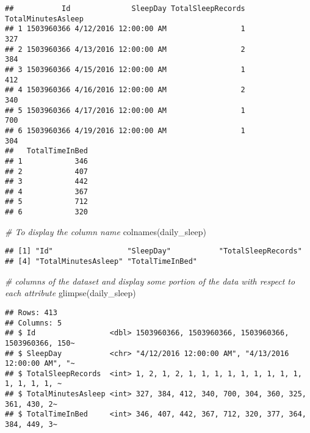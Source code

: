 \documentclass[
]{article}
\newenvironment{Shaded}{\begin{snugshade}}{\end{snugshade}}
\newcommand{\CommentTok}[1]{\textcolor[rgb]{0.56,0.35,0.01}{\textit{#1}}}
\newcommand{\FunctionTok}[1]{\textcolor[rgb]{0.00,0.00,0.00}{#1}}
\newcommand{\NormalTok}[1]{#1}
\newcommand{\SpecialCharTok}[1]{\textcolor[rgb]{0.00,0.00,0.00}{#1}}
\begin{document}
\begin{verbatim}
##           Id              SleepDay TotalSleepRecords TotalMinutesAsleep
## 1 1503960366 4/12/2016 12:00:00 AM                 1                327
## 2 1503960366 4/13/2016 12:00:00 AM                 2                384
## 3 1503960366 4/15/2016 12:00:00 AM                 1                412
## 4 1503960366 4/16/2016 12:00:00 AM                 2                340
## 5 1503960366 4/17/2016 12:00:00 AM                 1                700
## 6 1503960366 4/19/2016 12:00:00 AM                 1                304
##   TotalTimeInBed
## 1            346
## 2            407
## 3            442
## 4            367
## 5            712
## 6            320
\end{verbatim}

\begin{Shaded}
\begin{Highlighting}[]
\CommentTok{\# To display the column name }
\FunctionTok{colnames}\NormalTok{(daily\_sleep)}
\end{Highlighting}
\end{Shaded}

\begin{verbatim}
## [1] "Id"                 "SleepDay"           "TotalSleepRecords" 
## [4] "TotalMinutesAsleep" "TotalTimeInBed"
\end{verbatim}

\begin{Shaded}
\begin{Highlighting}[]
\CommentTok{\# columns of the dataset and display some portion of the data with respect to each attribute}
\FunctionTok{glimpse}\NormalTok{(daily\_sleep)}
\end{Highlighting}
\end{Shaded}

\begin{verbatim}
## Rows: 413
## Columns: 5
## $ Id                 <dbl> 1503960366, 1503960366, 1503960366, 1503960366, 150~
## $ SleepDay           <chr> "4/12/2016 12:00:00 AM", "4/13/2016 12:00:00 AM", "~
## $ TotalSleepRecords  <int> 1, 2, 1, 2, 1, 1, 1, 1, 1, 1, 1, 1, 1, 1, 1, 1, 1, ~
## $ TotalMinutesAsleep <int> 327, 384, 412, 340, 700, 304, 360, 325, 361, 430, 2~
## $ TotalTimeInBed     <int> 346, 407, 442, 367, 712, 320, 377, 364, 384, 449, 3~
\end{verbatim}

\begin{Shaded}
\end{Shaded}
\end{document}
